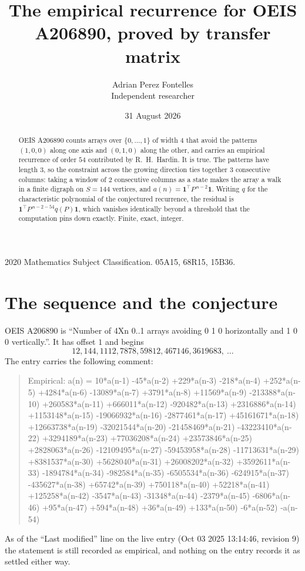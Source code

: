 \documentclass[11pt,a4paper]{article}
\title{The empirical recurrence for OEIS A206890, proved by transfer matrix}
\author{Adrian Perez Fontelles\\ \small Independent researcher}
\date{31 August 2026}
\theoremstyle{plain}
\theoremstyle{definition}
\begin{document}
\maketitle

\begin{abstract}
OEIS A206890 counts arrays over $\{0,\dots,1\}$ of width $4$ that avoid the patterns
$(1,0,0)$ along one axis and $(0,1,0)$ along the other, and carries an empirical recurrence of
order $54$ contributed by R.~H.~Hardin. It is true. The patterns have length $3$, so
the constraint across the growing direction ties together $3$ consecutive columns: taking a
window of $2$ consecutive columns as a state makes the array a walk in a finite digraph
on $S=144$ vertices, and $a(n)=\mathbf{1}^{\!\top}P^{\,n-2}\mathbf{1}$. Writing $q$
for the characteristic polynomial of the conjectured recurrence, the residual is
$\mathbf{1}^{\!\top}P^{\,n-2-54}q(P)\mathbf{1}$, which vanishes identically
beyond a threshold that the computation pins down exactly. Finite, exact, integer.
\end{abstract}

\noindent\small 2020 Mathematics Subject Classification. 05A15, 68R15, 15B36.\normalsize

\section{The sequence and the conjecture}

OEIS A206890 is ``Number of 4Xn 0..1 arrays avoiding 0 1 0 horizontally and 1 0 0 vertically.''. It has offset
$1$ and begins
\[
12, 144, 1112, 7878, 59812, 467146, 3619683,\ \dots
\]
The entry carries the following comment:
\begin{quote}\small
Empirical: a(n) = 10*a(n-1) -45*a(n-2) +229*a(n-3) -218*a(n-4) +252*a(n-5) +4284*a(n-6) -13089*a(n-7) +3791*a(n-8) +11569*a(n-9) -213388*a(n-10) +260583*a(n-11) +666011*a(n-12) -920482*a(n-13) +2316886*a(n-14) +1153148*a(n-15) -19066932*a(n-16) -2877461*a(n-17) +45161671*a(n-18) +12663738*a(n-19) -32021544*a(n-20) -21458469*a(n-21) -43223410*a(n-22) +3294189*a(n-23) +77036208*a(n-24) +23573846*a(n-25) +2828063*a(n-26) -12109495*a(n-27) -59453958*a(n-28) -11713631*a(n-29) +8381537*a(n-30) +5628040*a(n-31) +26008202*a(n-32) +3592611*a(n-33) -1894784*a(n-34) -982584*a(n-35) -6505534*a(n-36) -624915*a(n-37) -435627*a(n-38) +65742*a(n-39) +750118*a(n-40) +52218*a(n-41) +125258*a(n-42) -3547*a(n-43) -31348*a(n-44) -2379*a(n-45) -6806*a(n-46) +95*a(n-47) +594*a(n-48) +36*a(n-49) +133*a(n-50) -6*a(n-52) -a(n-54)
\end{quote}
As of the ``Last modified'' line on the live entry (Oct 03 2025 13:14:46, revision
9) the statement is still recorded as empirical, and nothing on the entry
records it as settled either way.
\end{document}
